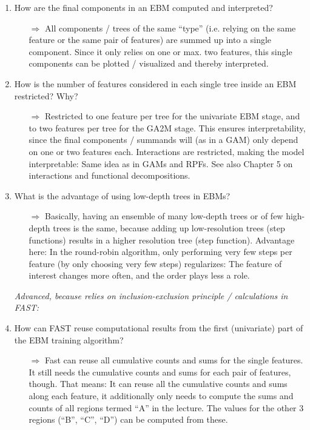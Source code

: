 \begin{enumerate}
        \item How are the final components in an EBM computed and interpreted?
        \begin{itemize}
            \item[$\Rightarrow$] All components / trees of the same ``type'' (i.e. relying on the same feature or the same pair of features) are summed up into a single component.
            Since it only relies on one or max. two features, this single components can be plotted / visualized and thereby interpreted.
        \end{itemize}

        \item How is the number of features considered in each single tree inside an EBM restricted? Why?
        \begin{itemize}
            \item[$\Rightarrow$]
            Restricted to one feature per tree for the univariate EBM stage, and to two features per tree for the GA2M stage.
            This ensures interpretability, since the final components / summands will (as in a GAM) only depend on one or two features each.
            Interactions are restricted, making the model interpretable: Same idea as in GAMs and RPFs.
            See also Chapter 5 on interactions and functional decompositions.
        \end{itemize}

        \item What is the advantage of using low-depth trees in EBMs?
        \begin{itemize}
            \item[$\Rightarrow$] Basically, having an ensemble of many low-depth trees or of few high-depth trees is the same, because adding up low-resolution trees (step functions) results in a higher resolution tree (step function).
            Advantage here: In the round-robin algorithm, only performing very few steps per feature (by only choosing very few steps) regularizes: The feature of interest changes more often, and the order plays less a role.
        \end{itemize}

        \textit{Advanced, because relies on inclusion-exclusion principle / calculations in FAST:}
        \item How can FAST reuse computational results from the first (univariate) part of the EBM training algorithm?
        \begin{itemize}
            \item[$\Rightarrow$]
            Fast can reuse all cumulative counts and sums for the single features.
            It still needs the cumulative counts and sums for each pair of features, though.
            That means: It can reuse all the cumulative counts and sums along each feature, it additionally only needs to compute the sums and counts of all regions termed ``A'' in the lecture.
            The values for the other 3 regions (``B'', ``C'', ``D'') can be computed from these.
        \end{itemize}
    	
	\end{enumerate}
